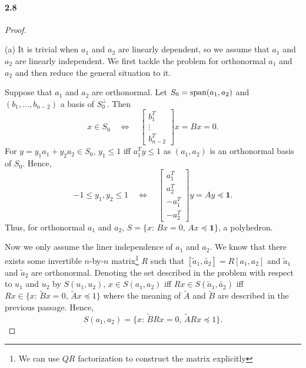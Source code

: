 \paragraph{2.8}
\begin{proof}
  $\,$\par
  (a) It is trivial when $a_1$ and $a_2$ are linearly dependent, so we assume 
  that $a_1$ and $a_2$ are linearly independent. We first tackle the problem for
  orthonormal $a_1$ and $a_2$ and then reduce the general situation to it.\par
  Suppose that $a_1$ and $a_2$ are orthonormal. Let $S_0=\operatorname{span}(a_1,a_2)$ and 
  $(b_1,\dots,b_{n-2})$ a basis of $S_0^\perp$. Then
  \[
    x\in S_0 \quad\Leftrightarrow\quad
    \begin{bmatrix}
      b_1^T \\ \vdots \\ b_{n-2}^T 
    \end{bmatrix}x = Bx = 0.
  \]
  For $y=y_1a_1+y_2a_2\in S_0$, $y_1\le 1$ iff $a_1^Ty \le 1$ as $(a_1,a_2)$ is
  an orthonormal basis of $S_0$. Hence, 
  \[
    -1\le y_1,y_2\le 1 \quad\Leftrightarrow\quad
    \begin{bmatrix}
      a_1^T \\ a_2^T \\ -a_1^T \\ -a_2^T
    \end{bmatrix}y = Ay \preceq \mathbf{1}.
  \]
  Thus, for orthonormal $a_1$ and $a_2$, $S=\{x:\, Bx=0,\, Ax\preceq\mathbf{1}\}
  $, a polyhedron.\par
  Now we only assume the liner independence of $a_1$ and $a_2$. We know that
  there exists some invertible $n$-by-$n$ matrix\footnote{We can use $QR$ 
  factorization to construct the matrix explicitly} $R$ such that $[\tilde{a}_1,
  \tilde{a_2}]=R[a_1,a_2]$ and $\tilde{a}_1$ and $\tilde{a}_2$ are orthonormal. 
  Denoting the set described in the problem with respect to $u_1$ and $u_2$ by
  $S(u_1,u_2)$, $x\in S(a_1,a_2)$ iff $Rx\in S(\tilde{a}_1,\tilde{a_2})$ iff
  $Rx \in \{x:\,\tilde{B}x=0,\, \tilde{A}x\preceq 1\}$ where the meaning of 
  $\tilde{A}$ and $\tilde{B}$ are described in the previous passage. Hence, 
  \[
    S(a_1,a_2) = \{x:\, \tilde{B}Rx=0,\, \tilde{A}Rx\preceq 1\}.
  \]
  

\end{proof}
